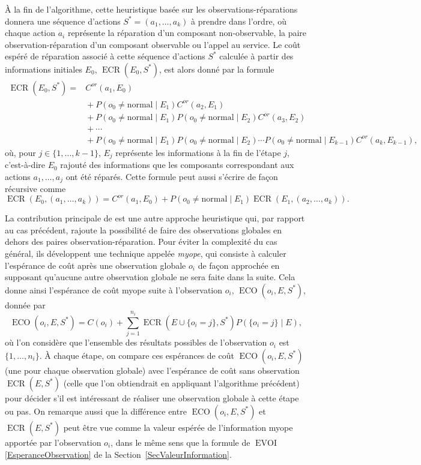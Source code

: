 \documentclass[a4paper,11pt]{article}
\theoremstyle{plain}
\theoremstyle{definition}
\DeclareMathOperator{\ECO}{ECO}
\DeclareMathOperator{\ECR}{ECR}
\DeclareMathOperator{\EVOI}{EVOI}
\begin{document}
À la fin de l'algorithme, cette heuristique basée sur les observations-réparations donnera une séquence d'actions $S^\ast = (a_1, \dotsc, a_k)$ à prendre dans l'ordre, où chaque action $a_i$ représente la réparation d'un composant non-observable, la paire observation-réparation d'un composant observable ou l'appel au service. Le coût espéré de réparation associé à cette séquence d'actions $S^\ast$ calculée à partir des informations initiales $E_0$, $\ECR(E_0, S^\ast)$, est alors donné par la formule
\begin{equation}
\label{EqECR}
\begin{aligned}
\ECR(E_0, S^\ast) = {} & C^{or}(a_1, E_0) \\
& {} + P(o_0 \neq \text{normal} \mid E_1) C^{or}(a_2, E_1) \\
& {} + P(o_0 \neq \text{normal} \mid E_1) P(o_0 \neq \text{normal} \mid E_2) C^{or}(a_3, E_2) \\
& {} + \dotsb \\
& {} + P(o_0 \neq \text{normal} \mid E_1) P(o_0 \neq \text{normal} \mid E_2) \dotsm P(o_0 \neq \text{normal} \mid E_{k-1}) C^{or}(a_k, E_{k-1}),
\end{aligned}
\end{equation}
où, pour $j \in \{1, \dotsc, k-1\}$, $E_j$ représente les informations à la fin de l'étape $j$, c'est-à-dire $E_0$ rajouté des informations que les composants correspondant aux actions $a_1, \dotsc, a_j$ ont été réparés. Cette formule peut aussi s'écrire de façon récursive comme
\[
\ECR(E_0, (a_1, \dotsc, a_k)) = C^{or}(a_1, E_0) + P(o_0 \neq \text{normal} \mid E_1) \ECR(E_1, (a_2, \dotsc, a_k)).
\]

La contribution principale de \cite{heckerman1994troubleshooting, Heckerman_1995} est une autre approche heuristique qui, par rapport au cas précédent, rajoute la possibilité de faire des observations globales en dehors des paires ob\-ser\-va\-tion-ré\-pa\-ra\-tion. Pour éviter la complexité du cas général, ils développent une technique appelée \emph{myope}, qui consiste à calculer l'espérance de coût après une observation globale $o_i$ de façon approchée en supposant qu'aucune autre observation globale ne sera faite dans la suite. Cela donne ainsi l'espérance de coût myope suite à l'observation $o_i$, $\ECO(o_i, E, S^\ast)$, donnée par
\[
\ECO(o_i, E, S^\ast) = C(o_i) + \sum_{j=1}^{n_i} \ECR(E \cup \{o_i = j\}, S^\ast) P(\{o_i = j\} \mid E),
\]
où l'on considère que l'ensemble des résultats possibles de l'observation $o_i$ est $\{1, \dotsc, n_i\}$. À chaque étape, on compare ces espérances de coût $\ECO(o_i, E, S^\ast)$ (une pour chaque observation globale) avec l'espérance de coût sans observation $\ECR(E, S^\ast)$ (celle que l'on obtiendrait en appliquant l'algorithme précédent) pour décider s'il est intéressant de réaliser une observation globale à cette étape ou pas. On remarque aussi que la différence entre $\ECO(o_i, E, S^\ast)$ et $\ECR(E, S^\ast)$ peut être vue comme la valeur espérée de l'information myope apportée par l'observation $o_i$, dans le même sens que la formule de $\EVOI$ \eqref{EsperanceObservation} de la Section~\ref{SecValeurInformation}.
\end{document}
